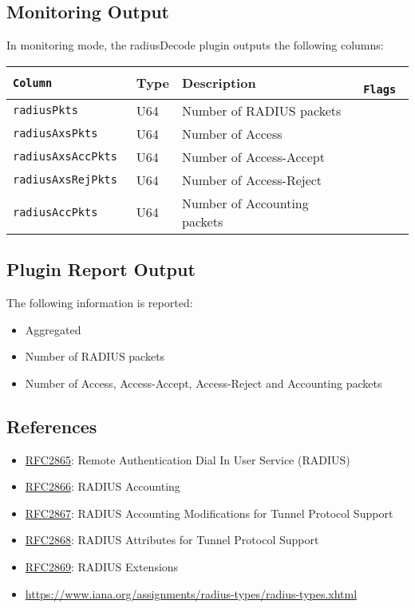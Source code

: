 \documentclass[documentation]{subfiles}
\begin{document}
\subsection{Monitoring Output}
In monitoring mode, the radiusDecode plugin outputs the following columns:
\begin{longtable}{>{\tt}lll>{\tt\small}l}
    \toprule
    {\bf Column} & {\bf Type} & {\bf Description} & {\bf Flags}\\
    \midrule\endhead%
    radiusPkts       & U64 & Number of RADIUS packets     & \\
    radiusAxsPkts    & U64 & Number of Access             & \\
    radiusAxsAccPkts & U64 & Number of Access-Accept      & \\
    radiusAxsRejPkts & U64 & Number of Access-Reject      & \\
    radiusAccPkts    & U64 & Number of Accounting packets & \\
    \bottomrule
\end{longtable}

\subsection{Plugin Report Output}
The following information is reported:
\begin{itemize}
    \item Aggregated {\tt{}}
    \item Number of RADIUS packets
    \item Number of Access, Access-Accept, Access-Reject and Accounting packets
\end{itemize}

\subsection{References}
\begin{itemize}
    \item \href{https://tools.ietf.org/html/rfc2865}{RFC2865}: Remote Authentication Dial In User Service (RADIUS)
    \item \href{https://tools.ietf.org/html/rfc2866}{RFC2866}: RADIUS Accounting
    \item \href{https://tools.ietf.org/html/rfc2867}{RFC2867}: RADIUS Accounting Modifications for Tunnel Protocol Support
    \item \href{https://tools.ietf.org/html/rfc2868}{RFC2868}: RADIUS Attributes for Tunnel Protocol Support
    \item \href{https://tools.ietf.org/html/rfc2869}{RFC2869}: RADIUS Extensions
    \item \url{https://www.iana.org/assignments/radius-types/radius-types.xhtml}
\end{itemize}
\end{document}
